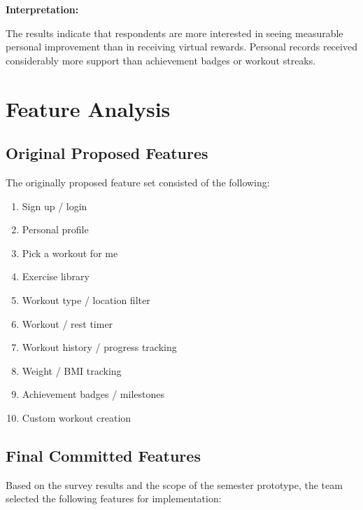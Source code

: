 \documentclass[11pt]{article}
\begin{document}
\textbf{Interpretation:}

The results indicate that respondents are more interested in seeing measurable personal improvement than in receiving virtual rewards. Personal records received considerably more support than achievement badges or workout streaks.


\section{Feature Analysis}

\subsection{Original Proposed Features}

The originally proposed feature set consisted of the following:

\begin{enumerate}
    \item Sign up / login
    \item Personal profile
    \item Pick a workout for me
    \item Exercise library
    \item Workout type / location filter
    \item Workout / rest timer
    \item Workout history / progress tracking
    \item Weight / BMI tracking
    \item Achievement badges / milestones
    \item Custom workout creation
\end{enumerate}


\subsection{Final Committed Features}

Based on the survey results and the scope of the semester prototype, the team selected the following features for implementation:
\end{document}
